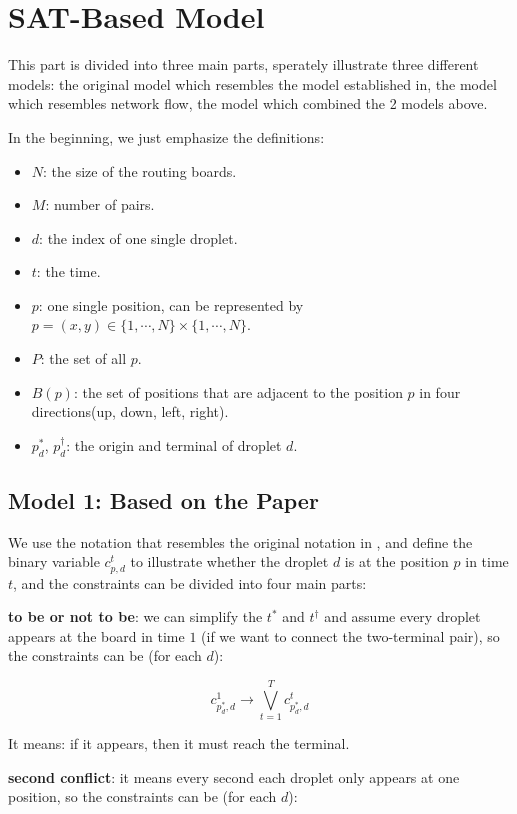 \documentclass[twocolumn]{article}
\begin{document}
\section{SAT-Based Model}

This part is divided into three main parts, sperately illustrate three different models: the original model which resembles the model established in\cite{source1}, the model which resembles network flow, the model which combined the 2 models above.

In the beginning, we just emphasize the definitions:

\begin{itemize}
	\item $N$: the size of the routing boards.
	\item $M$: number of pairs.
	\item $d$: the index of one single droplet.
	\item $t$: the time.
	\item $p$: one single position, can be represented by $p = (x, y) \in \{1, \cdots, N\} \times \{1, \cdots, N\}$.
	\item $P$: the set of all $p$.
	\item $B(p)$: the set of positions that are adjacent to the position $p$ in four directions(up, down, left, right).
	\item $p^*_d$, $p^\dagger_d$: the origin and terminal of droplet $d$.
\end{itemize}

\subsection{Model 1: Based on the Paper}

We use the notation that resembles the original notation in \cite{source1}, and define the binary variable $c_{p,d}^t$ to illustrate whether the droplet $d$ is at the position $p$ in time $t$, and the constraints can be divided into four main parts:

\textbf{to be or not to be}: we can simplify the $t^*$ and $t^\dagger$ and assume every droplet appears at the board in time $1$ (if we want to connect the two-terminal pair), so the constraints can be (for each $d$):

\[
 c_{p^*_d,d}^1 \to \bigvee_{t=1}^{T} c_{p^*_d, d}^t
\]

It means: if it appears, then it must reach the terminal.

\textbf{second conflict}: it means every second each droplet only appears at one position, so the constraints can be (for each $d$):
\end{document}

